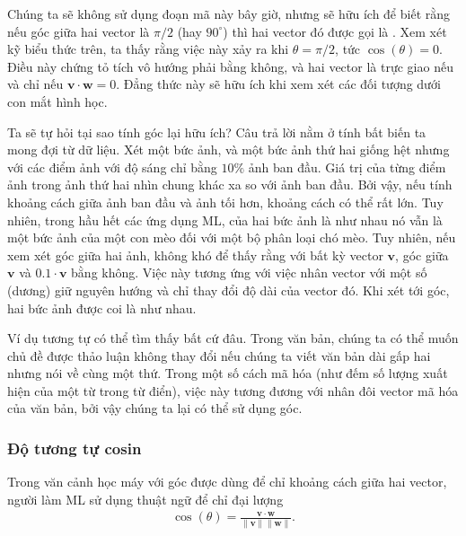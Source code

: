 \documentclass[letterpaper,11pt,english]{sphinxmanual}
\begin{document}
Chúng ta sẽ không sử dụng đoạn mã này bây giờ, nhưng sẽ hữu ích để biết
rằng nếu góc giữa hai vector là \(\pi/2\) (hay \(90^{\circ}\))
thì hai vector đó được gọi là . Xem xét kỹ biểu thức trên, ta
thấy rằng việc này xảy ra khi \(\theta = \pi/2\), tức
\(\cos(\theta) = 0\). Điều này chứng tỏ tích vô hướng phải bằng
không, và hai vector là trực giao nếu và chỉ nếu
\(\mathbf{v}\cdot\mathbf{w} = 0\). Đẳng thức này sẽ hữu ích khi xem
xét các đối tượng dưới con mắt hình học.



Ta sẽ tự hỏi tại sao tính góc lại hữu ích? Câu trả lời nằm ở tính bất
biến ta mong đợi từ dữ liệu. Xét một bức ảnh, và một bức ảnh thứ hai
giống hệt nhưng với các điểm ảnh với độ sáng chỉ bằng \(10\%\) ảnh
ban đầu. Giá trị của từng điểm ảnh trong ảnh thứ hai nhìn chung khác xa
so với ảnh ban đầu. Bởi vậy, nếu tính khoảng cách giữa ảnh ban đầu và
ảnh tối hơn, khoảng cách có thể rất lớn. Tuy nhiên, trong hầu hết các
ứng dụng ML,  của hai bức ảnh là như nhau \textendash{} nó vẫn là một bức
ảnh của một con mèo đối với một bộ phân loại chó mèo. Tuy nhiên, nếu xem
xét góc giữa hai ảnh, không khó để thấy rằng với bất kỳ vector
\(\mathbf{v}\), góc giữa \(\mathbf{v}\) và
\(0.1\cdot\mathbf{v}\) bằng không. Việc này tương ứng với việc nhân
vector với một số (dương) giữ nguyên hướng và chỉ thay đổi độ dài của
vector đó. Khi xét tới góc, hai bức ảnh được coi là như nhau.



Ví dụ tương tự có thể tìm thấy bất cứ đâu. Trong văn bản, chúng ta có
thể muốn chủ đề được thảo luận không thay đổi nếu chúng ta viết văn bản
dài gấp hai nhưng nói về cùng một thứ. Trong một số cách mã hóa (như đếm
số lượng xuất hiện của một từ trong từ điển), việc này tương đương với
nhân đôi vector mã hóa của văn bản, bởi vậy chúng ta lại có thể sử dụng
góc.








\subsubsection{Độ tương tự cosin}
\label{\detokenize{chapter_appendix_math/geometry-linear-algebric-ops_vn:do-tuong-tu-cosin}}


Trong văn cảnh học máy với góc được dùng để chỉ khoảng cách giữa hai
vector, người làm ML sử dụng thuật ngữ  để chỉ đại
lượng
\begin{equation}\label{equation:chapter_appendix_math/geometry-linear-algebric-ops_vn:chapter_appendix_math/geometry-linear-algebric-ops_vn:6}
\begin{split}\cos(\theta) = \frac{\mathbf{v}\cdot\mathbf{w}}{\|\mathbf{v}\|\|\mathbf{w}\|}.\end{split}
\end{equation}
\end{document}
